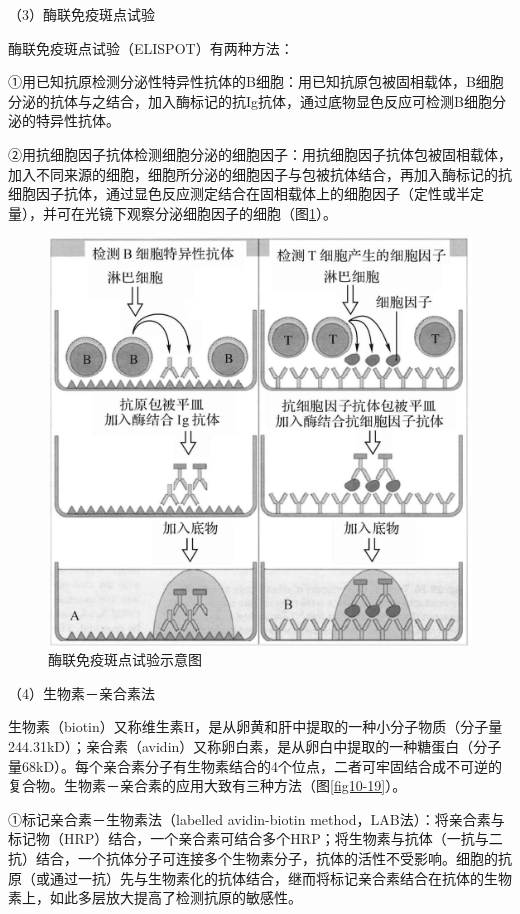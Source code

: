 （3）酶联免疫斑点试验

酶联免疫斑点试验（ELISPOT）有两种方法：

①用已知抗原检测分泌性特异性抗体的B细胞：用已知抗原包被固相载体，B细胞分泌的抗体与之结合，加入酶标记的抗Ig抗体，通过底物显色反应可检测B细胞分泌的特异性抗体。

②用抗细胞因子抗体检测细胞分泌的细胞因子：用抗细胞因子抗体包被固相载体，加入不同来源的细胞，细胞所分泌的细胞因子与包被抗体结合，再加入酶标记的抗细胞因子抗体，通过显色反应测定结合在固相载体上的细胞因子（定性或半定量），并可在光镜下观察分泌细胞因子的细胞（图\ref{fig10-18}）。

\begin{figure}[!htbp]
 \centering
 \includegraphics[width=.5\textwidth]{./images/Image00170.jpg}
 \captionsetup{justification=centering}
 \caption{酶联免疫斑点试验示意图}
 \label{fig10-18}
  \end{figure} 

（4）生物素－亲合素法

生物素（biotin）又称维生素H，是从卵黄和肝中提取的一种小分子物质（分子量244.31kD）；亲合素（avidin）又称卵白素，是从卵白中提取的一种糖蛋白（分子量68kD）。每个亲合素分子有生物素结合的4个位点，二者可牢固结合成不可逆的复合物。生物素－亲合素的应用大致有三种方法（图\ref{fig10-19}）。

①标记亲合素－生物素法（labelled avidin-biotin
method，LAB法）：将亲合素与标记物（HRP）结合，一个亲合素可结合多个HRP；将生物素与抗体（一抗与二抗）结合，一个抗体分子可连接多个生物素分子，抗体的活性不受影响。细胞的抗原（或通过一抗）先与生物素化的抗体结合，继而将标记亲合素结合在抗体的生物素上，如此多层放大提高了检测抗原的敏感性。

